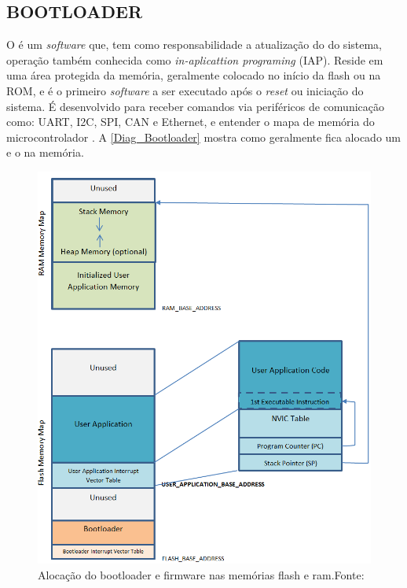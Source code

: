 \subsection{BOOTLOADER}
O \bootloader é um \textit{software} que, tem como responsabilidade a atualização do \firmware do sistema, operação também conhecida como \textit{in-aplicattion programing} (IAP). Reside em uma área protegida da memória, geralmente colocado no início da flash ou na ROM, e é o primeiro \textit{software} a ser executado após o \textit{reset} ou iniciação do sistema.
É desenvolvido para receber comandos via periféricos de comunicação como: UART, I2C, SPI, CAN e Ethernet, e entender o mapa de memória do microcontrolador \cite{DavesDurlin2013}. A \autoref{Diag_Bootloader} mostra como geralmente fica alocado um \bootloader e o \firmware na memória.

\begin{figure}[H]
    \scriptsize
     \centering
     \includegraphics[scale=0.7]{dados/figuras/DiagBootloaderOriginal.png}
     \caption{Alocação do bootloader e firmware nas memórias flash e ram.\newline Fonte:\cite{DavesDurlin2013}}
     \label{Diag_Bootloader}
\end{figure}

